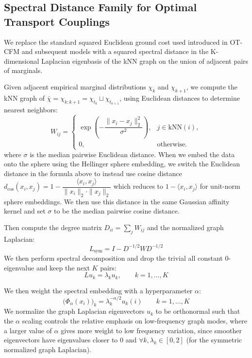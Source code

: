 \subsection{Spectral Distance Family for Optimal Transport Couplings}\label{sec:spec_dist_fam}
We replace the standard squared Euclidean ground cost used introduced in OT-CFM \cite{tongImprovingGeneralizingFlowbased2024} and subsequent models with a squared spectral distance in the K-dimensional Laplacian eigenbasis of the kNN graph on the union of adjacent pairs of marginals.

Given adjacent empirical marginal distributions $\chi_k$ and $\chi_{k+1}$, we compute the kNN graph of $\bar \chi=\chi_{k\colon k+1}=\chi_{t_k}\sqcup \chi_{t_{k+1}}$, using Euclidean distances to determine nearest neighbors:
\begin{equation}
    W_{ij}=
    \begin{cases}
        \exp \left(-\dfrac{\|x_i-x_j\|_2^2}{\sigma^2}\right),&j\in \mathrm{kNN}(i),\\[4pt]
        0,&\text{otherwise}.
    \end{cases}
\label{eq:knn_graph}
\end{equation}
where $\sigma$ is the median pairwise Euclidean distance. When we embed the data onto the sphere using the Hellinger sphere embedding, we switch the Euclidean distance in the formula above to instead use cosine distance $d_{\cos}(x_i,x_j)=1-\dfrac{\langle x_i,x_j\rangle}{\|x_i\|_2\cdot \|x_j\|_2}$ which reduces to $1-\langle x_i,x_j\rangle$ for unit-norm sphere embeddings. We then use this distance in the same Gaussian affinity kernel and set $\sigma$ to be the median pairwise cosine distance.

Then compute the degree matrix $D_{ii}=\sum_jW_{ij}$ and the normalized graph Laplacian:
\begin{equation}
    L_{\mathrm{sym}} = I - D^{-1/2} W D^{-1/2}
    \label{eq:normalized_laplacian}
\end{equation}
We then perform spectral decomposition and drop the trivial all constant $0$-eigenvalue and keep the next $K$ pairs:
\begin{equation}
Lu_k=\lambda _ku_k,\qquad k=1,\dots,K
\label{eq:laplacian_eigenpairs}
\end{equation}

We then weight the spectral embedding with a hyperparameter $\alpha$:
\begin{equation}
\bigl (\Phi_\alpha(x_i)\bigr)_k=\lambda_k^{-\alpha/2}u_k(i)\qquad k=1,\dots,K
\label{eq:spectral_embedding}
\end{equation}
We normalize the graph Laplacian eigenvectors $u_k$ to be orthonormal such that the $\alpha$ scaling controls the relative emphasis on low-frequency graph modes, where a larger value of $\alpha$ gives more weight to low frequency variation, since smoother eigenvectors have eigenvalues closer to $0$ and $\forall k,\lambda_k\in[0,2]$ (for the symmetric normalized graph Laplacian).

